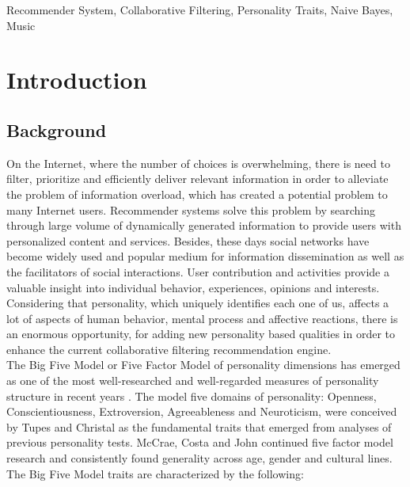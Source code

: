\documentclass[conference]{IEEEtran}
\begin{document}
\begin{IEEEkeywords}
Recommender System, Collaborative Filtering, Personality Traits, Naive Bayes, Music
\end{IEEEkeywords}

\section{Introduction}


\subsection{Background}
On the Internet, where the number of choices is overwhelming, there is need to filter, prioritize and efficiently deliver relevant information in order to alleviate the problem of information overload, which has created a potential problem to many Internet users. Recommender systems solve this problem by searching through large volume of dynamically generated information to provide users with personalized content and services. Besides, these days social networks have become widely used and popular medium for information dissemination as well as the facilitators of social interactions. User contribution and activities provide a valuable insight into individual behavior, experiences, opinions and interests. Considering that personality, which uniquely identifies each one of us, affects a lot of aspects of human behavior, mental process and affective reactions, there is an enormous opportunity, for adding new personality based qualities in order to enhance the current collaborative filtering recommendation engine.\\
The Big Five Model or Five Factor Model of personality dimensions has emerged as one of the most well-researched and well-regarded measures of personality structure in recent years \cite{fivefactormodel}. The model five domains of personality: Openness, Conscientiousness, Extroversion, Agreeableness and Neuroticism, were conceived by Tupes and Christal \cite{tupes} as the fundamental traits that emerged from analyses of previous personality tests. McCrae, Costa and John \cite{mccrae} continued five factor model research and consistently found generality across age, gender and cultural lines.
The Big Five Model traits are characterized by the following:
\end{document}
